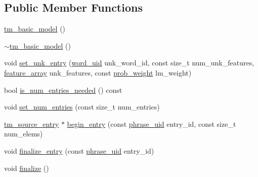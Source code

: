 \subsection*{Public Member Functions}
\begin{DoxyCompactItemize}
\item 
\hyperlink{classuva_1_1smt_1_1bpbd_1_1server_1_1tm_1_1models_1_1tm__basic__model_a2e9c82baffbd76066678d160f04f3670}{tm\+\_\+basic\+\_\+model} ()
\item 
\hyperlink{classuva_1_1smt_1_1bpbd_1_1server_1_1tm_1_1models_1_1tm__basic__model_ae91ca222eb97cedf6d0061c19bf09f34}{$\sim$tm\+\_\+basic\+\_\+model} ()
\item 
void \hyperlink{classuva_1_1smt_1_1bpbd_1_1server_1_1tm_1_1models_1_1tm__basic__model_ac918da19577ee1f83d109edc965d1e34}{set\+\_\+unk\+\_\+entry} (\hyperlink{namespaceuva_1_1smt_1_1bpbd_1_1server_a6bfe45ba344d65a7fdd7d26156328ddc}{word\+\_\+uid} unk\+\_\+word\+\_\+id, const size\+\_\+t num\+\_\+unk\+\_\+features, \hyperlink{namespaceuva_1_1smt_1_1bpbd_1_1server_1_1tm_1_1models_a2181caec035a699138a4dcedfd7c2c26}{feature\+\_\+array} unk\+\_\+features, const \hyperlink{namespaceuva_1_1smt_1_1bpbd_1_1server_a01e9ea4de9c226f4464862e84ff0bbcc}{prob\+\_\+weight} lm\+\_\+weight)
\item 
bool \hyperlink{classuva_1_1smt_1_1bpbd_1_1server_1_1tm_1_1models_1_1tm__basic__model_ad51f4c4c4b2c497de4bb8029d617b1bc}{is\+\_\+num\+\_\+entries\+\_\+needed} () const 
\item 
void \hyperlink{classuva_1_1smt_1_1bpbd_1_1server_1_1tm_1_1models_1_1tm__basic__model_a698fd1508e4e121c3879dfe34f4103ef}{set\+\_\+num\+\_\+entries} (const size\+\_\+t num\+\_\+entries)
\item 
\hyperlink{classuva_1_1smt_1_1bpbd_1_1server_1_1tm_1_1models_1_1tm__source__entry}{tm\+\_\+source\+\_\+entry} $\ast$ \hyperlink{classuva_1_1smt_1_1bpbd_1_1server_1_1tm_1_1models_1_1tm__basic__model_ab1d7271b4887a7459191441a2a293a7c}{begin\+\_\+entry} (const \hyperlink{namespaceuva_1_1smt_1_1bpbd_1_1server_ad18d4cdf5504e76c22b0c124ff60b44f}{phrase\+\_\+uid} entry\+\_\+id, const size\+\_\+t num\+\_\+elems)
\item 
void \hyperlink{classuva_1_1smt_1_1bpbd_1_1server_1_1tm_1_1models_1_1tm__basic__model_a91ded0e89956a858680218943e573637}{finalize\+\_\+entry} (const \hyperlink{namespaceuva_1_1smt_1_1bpbd_1_1server_ad18d4cdf5504e76c22b0c124ff60b44f}{phrase\+\_\+uid} entry\+\_\+id)
\item 
void \hyperlink{classuva_1_1smt_1_1bpbd_1_1server_1_1tm_1_1models_1_1tm__basic__model_a9f28bc1847fe1a7905696d7716de2be9}{finalize} ()

\end{DoxyCompactItemize}
